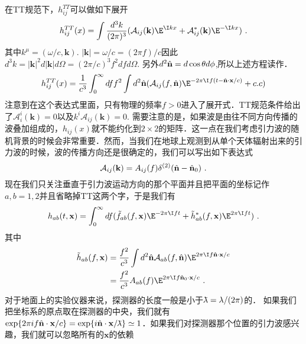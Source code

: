 在TT规范下，$h^{TT}_{ij}$可以做如下展开
\begin{equation}
h^{TT}_{ij}(x) = \int \frac{d^3 k}{(2\pi)^3} (\mathcal A_{ij}(\mathbf k) \E^{\I kx} + \mathcal A_{ij}^* (\mathbf k) \E^{-\I k x} ) ~. 
\end{equation}
其中$k^\mu = (\omega/c,\mathbf k)$. $|\mathbf k| = \omega/c = (2\pi f)/c$因此$d^3 k = |\mathbf k|^2 d|\mathbf k| d\Omega = (2\pi/c)^3 f^2 df d\Omega $. 另外$d^2\hat{\bf{n}} = d\cos\theta d\phi$,所以上述方程读作．
\begin{equation}\label{TTGaug_eq4}
h^{TT}_{ij}(x) = \frac{1}{c^3} \int^\infty_0 df f^2 \int d^2 \hat{ \bf{n} } ( \mathcal A_{ij} (f,\hat{ \bf{n} }) \E^{-2\pi \I f(t-\hat{ {\bf n} } \cdot {\bf x} /c  )}  + {c.c} ) 
\end{equation}
注意到在这个表达式里面，只有物理的频率$f>0$进入了展开式．TT规范条件给出了$\mathcal A^i_i (\mathbf k) =0 $以及$k^i \mathcal A_{ij} (\mathbf k) =0 $. 需要注意的是，如果波是由往不同方向传播的波叠加组成的，$h_{ij}(x)$就不能约化到$2\times 2$的矩阵．这一点在我们考虑引力波的随机背景的时候会非常重要．然而，当我们在地球上观测到从单个天体辐射出来的引力波的时候，波的传播方向还是很确定的，我们可以写出如下表达式
\begin{equation}
\mathcal A_{ij} (\mathbf k) = A_{ij} (f) \delta^{(2)} (\hat{  \mathbf n } - \hat{ {\bf n} }_0 )~.
\end{equation}
现在我们只关注垂直于引力波运动方向的那个平面并且把平面的坐标记作$a,b = 1,2$并且省略掉TT这两个字，于是我们有
\begin{equation}
h_{ab} (t,\mathbf x ) = \int^\infty_0 df ( \tilde f_{ab} (f,\mathbf x) \E^{-2\pi \I f t} + \tilde h^*_{ab} (f,\mathbf x) \E^{2\pi \I f t} ) ~. 
\end{equation}
其中
\begin{equation}
\begin{aligned}
\tilde h_{ab} (f,\mathbf x) & = \frac{f^2}{c^3} \int d^2 \hat{  \mathbf n } \mathcal A_{ab} (f, \hat{\mathbf{n}}) \E^{2\pi \I f \hat{  \mathbf n } \cdot \mathbf x / c  } \\
& = \frac{f^2}{c^3} A_{ab} (f) \E^{2\pi \I f {\hat{\mathbf n}_0 \cdot \mathbf x /c  } }~.
\end{aligned}
\end{equation} 
对于地面上的实验仪器来说，探测器的长度一般是小于${\mkern0.7mu {\bar{\phantom{a}}} \mkern -11mu\lambda} = \lambda/(2\pi)$的． 如果我们把坐标系的原点取在探测器的中央，我们就有$\exp  \{   2\pi i f \hat{ \mathbf n } \cdot \mathbf x/c \} = \exp \{ i \hat{ {\bf n} } \cdot \mathbf x / {\mkern0.75mu {\bar{\phantom{a}}} \mkern -11.75mu\lambda} \} \simeq 1  $．如果我们对探测器那个位置的引力波感兴趣，我们就可以忽略所有的$\mathbf x$的依赖

